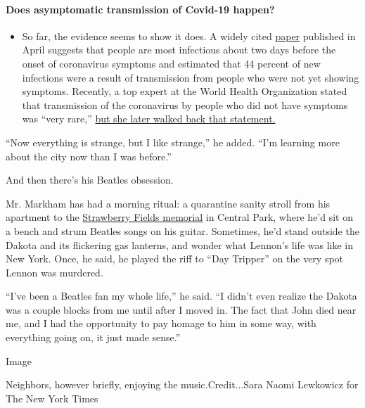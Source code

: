 \begin{itemize}
{  \paragraph{Does asymptomatic transmission of Covid-19
  happen?}\label{does-asymptomatic-transmission-of-covid-19-happen}}

  \begin{itemize}
  \tightlist
  \item
    So far, the evidence seems to show it does. A widely cited
    \href{https://www.nature.com/articles/s41591-020-0869-5}{paper}
    published in April suggests that people are most infectious about
    two days before the onset of coronavirus symptoms and estimated that
    44 percent of new infections were a result of transmission from
    people who were not yet showing symptoms. Recently, a top expert at
    the World Health Organization stated that transmission of the
    coronavirus by people who did not have symptoms was ``very rare,''
    \href{https://www.nytimes3xbfgragh.onion/2020/06/09/world/coronavirus-updates.html?action=click\&pgtype=Article\&state=default\&region=MAIN_CONTENT_3\&context=storylines_faq\#link-1f302e21}{but
    she later walked back that statement.}
  \end{itemize}
\end{itemize}

``Now everything is strange, but I like strange,'' he added. ``I'm
learning more about the city now than I was before.''

And then there's his Beatles obsession.

Mr. Markham has had a morning ritual: a quarantine sanity stroll from
his apartment to the
\href{https://www.centralparknyc.org/attractions/strawberry-fields}{Strawberry
Fields memorial} in Central Park, where he'd sit on a bench and strum
Beatles songs on his guitar. Sometimes, he'd stand outside the Dakota
and its flickering gas lanterns, and wonder what Lennon's life was like
in New York. Once, he said, he played the riff to ``Day Tripper'' on the
very spot Lennon was murdered.

``I've been a Beatles fan my whole life,'' he said. ``I didn't even
realize the Dakota was a couple blocks from me until after I moved in.
The fact that John died near me, and I had the opportunity to pay homage
to him in some way, with everything going on, it just made sense.''

Image

Neighbors, however briefly, enjoying the music.Credit...Sara Naomi
Lewkowicz for The New York Times

